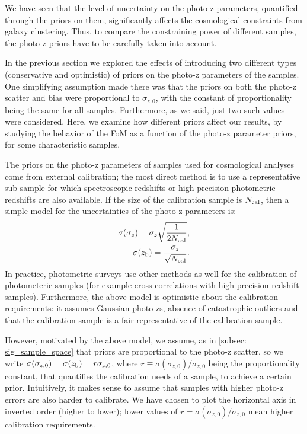 \documentclass[a4paper,fleqn,usenatbib]{mnras}
\begin{document}
We have seen that the level of uncertainty on the photo-z parameters, quantified through the priors on them, significantly affects the cosmological constraints from galaxy clustering. Thus, to compare the constraining power of different samples, the photo-z priors have to be carefully taken into account.

In the previous section we explored the effects of introducing two different types (conservative and optimistic) of priors on the photo-z parameters of the samples. One simplifying assumption made there was that the priors on both the photo-z scatter and bias were proportional to $\sigma_{z,0}$, with the constant of proportionality being the same for all samples. Furthermore, as we said, just two such values were considered. Here, we examine how different priors affect our results, by studying the behavior of the FoM  as a function of the photo-z parameter priors, for some characteristic samples.

The priors on the photo-z parameters of samples used for cosmological analyses come from external calibration; the most direct method is to use a representative sub-sample for which spectroscopic redshifts or high-precision photometric redshifts are also available. If the size of the calibration sample is $N_{\mbox{\scriptsize{cal}}}$, then a simple model for the uncertainties of the photo-z parameters is:
\begin{eqnarray}
\label{eq: simple_prior_model}
\sigma(\sigma_z) = \sigma_z \sqrt{\frac{1}{2N_{\mbox{\scriptsize{cal}}}}},\\
\sigma(z_{\mbox{\scriptsize{b}}}) = \frac{\sigma_z}{\sqrt{N_{\mbox{\scriptsize{cal}}}}}.
\end{eqnarray}
In practice, photometric surveys use other methods as well for the calibration of photometeric samples (for example cross-correlations with high-precision redshift samples). Furthermore, the above model is optimistic about the calibration requirements: it assumes Gaussian photo-zs, absence of catastrophic outliers and that the calibration sample is a fair representative of the calibration sample.

However, motivated by the above model, we assume, as in \ref{subsec: sig_sample_space} that priors are proportional to the photo-z scatter, so we write $\sigma(\sigma_{z,0}) = \sigma(z_{\mbox{\scriptsize{b}}}) = r  \sigma_{z,0}$, where $r \equiv \sigma(\sigma_{z,0})/\sigma_{z,0}$  being the proportionality constant, that quantifies the calibration needs of a sample, to achieve a certain prior. Intuitively, it makes sense to assume that samples with higher photo-z errors are also harder to calibrate. We  have chosen to plot the horizontal axis  in inverted order (higher to lower); lower values of $r = \sigma(\sigma_{z,0})/\sigma_{z,0}$ mean higher calibration requirements. 
\end{document}
